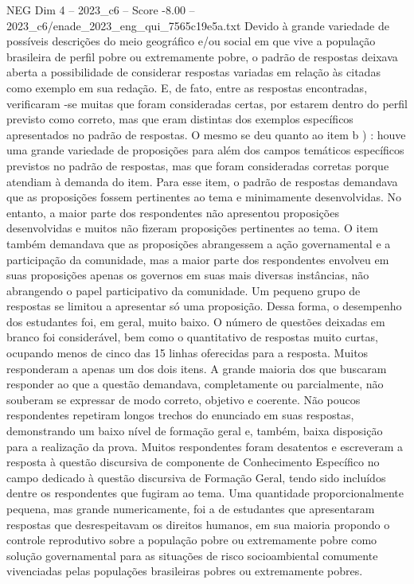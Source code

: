 \begin{textsample}{NEG Dim 4 – 2023\_c6 – Score -8.00 – 2023\_c6/enade\_2023\_eng\_qui\_7565c19e5a.txt}
Devido à grande variedade de possíveis descrições do meio geográfico e/ou social em que vive a população brasileira de perfil pobre ou extremamente pobre, o padrão de respostas deixava aberta a possibilidade de considerar respostas variadas em relação às citadas como exemplo em sua redação.
E, de fato, entre as respostas encontradas, verificaram -se muitas que foram consideradas certas, por estarem dentro do perfil previsto como correto, mas que eram distintas dos exemplos específicos apresentados no padrão de respostas.
O mesmo se deu quanto ao item b ) : houve uma grande variedade de proposições para além dos campos temáticos específicos previstos no padrão de respostas, mas que foram consideradas corretas porque atendiam à demanda do item.
Para esse item, o padrão de respostas demandava que as proposições fossem pertinentes ao tema e minimamente desenvolvidas.
No entanto, a maior parte dos respondentes não apresentou proposições desenvolvidas e muitos não fizeram proposições pertinentes ao tema.
O item também demandava que as proposições abrangessem a ação governamental e a participação da comunidade, mas a maior parte dos respondentes envolveu em suas proposições apenas os governos em suas mais diversas instâncias, não abrangendo o papel participativo da comunidade.
Um pequeno grupo de respostas se limitou a apresentar só uma proposição.
Dessa forma, o desempenho dos estudantes foi, em geral, muito baixo.
O número de questões deixadas em branco foi considerável, bem como o quantitativo de respostas muito curtas, ocupando menos de cinco das 15 linhas oferecidas para a resposta.
Muitos responderam a apenas um dos dois itens.
A grande maioria dos que buscaram responder ao que a questão demandava, completamente ou parcialmente, não souberam se expressar de modo correto, objetivo e coerente.
Não poucos respondentes repetiram longos trechos do enunciado em suas respostas, demonstrando um baixo nível de formação geral e, também, baixa disposição para a realização da prova.
Muitos respondentes foram desatentos e escreveram a resposta à questão discursiva de componente de Conhecimento Específico no campo dedicado à questão discursiva de Formação Geral, tendo sido incluídos dentre os respondentes que fugiram ao tema.
Uma quantidade proporcionalmente pequena, mas grande numericamente, foi a de estudantes que apresentaram respostas que desrespeitavam os direitos humanos, em sua maioria propondo o controle reprodutivo sobre a população pobre ou extremamente pobre como solução governamental para as situações de risco socioambiental comumente vivenciadas pelas populações brasileiras pobres ou extremamente pobres.

\end{textsample}
